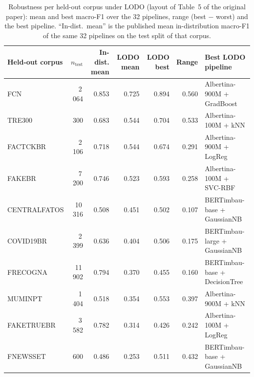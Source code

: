 \begin{table}[t]
\centering
\small
\caption{Robustness per held-out corpus under LODO (layout of Table~5 of the original paper): mean and best macro-F1 over the 32 pipelines, range (best $-$ worst) and the best pipeline. ``In-dist.\ mean'' is the published mean in-distribution macro-F1 of the same 32 pipelines on the test split of that corpus.}
\label{tab:lodo-by-dataset}
\begin{tabular}{lrrrrrl}
\toprule
Held-out corpus & $n_{\text{test}}$ & In-dist. mean & LODO mean & LODO best & Range & Best LODO pipeline \\
\midrule
FCN & 2\,064 & 0.853 & 0.725 & 0.894 & 0.560 & Albertina-900M + GradBoost \\
TRE300 & 300 & 0.683 & 0.544 & 0.704 & 0.533 & Albertina-100M + kNN \\
FACTCKBR & 2\,106 & 0.718 & 0.544 & 0.674 & 0.291 & Albertina-900M + LogReg \\
FAKEBR & 7\,200 & 0.746 & 0.523 & 0.593 & 0.258 & Albertina-100M + SVC-RBF \\
CENTRALFATOS & 10\,316 & 0.508 & 0.451 & 0.502 & 0.107 & BERTimbau-base + GaussianNB \\
COVID19BR & 2\,399 & 0.636 & 0.404 & 0.506 & 0.175 & BERTimbau-large + GaussianNB \\
FRECOGNA & 11\,902 & 0.794 & 0.370 & 0.455 & 0.160 & BERTimbau-base + DecisionTree \\
MUMINPT & 1\,404 & 0.518 & 0.354 & 0.553 & 0.397 & Albertina-900M + kNN \\
FAKETRUEBR & 3\,582 & 0.782 & 0.314 & 0.426 & 0.242 & Albertina-100M + LogReg \\
FNEWSSET & 600 & 0.486 & 0.253 & 0.511 & 0.432 & BERTimbau-base + GaussianNB \\
\bottomrule
\end{tabular}
\end{table}
